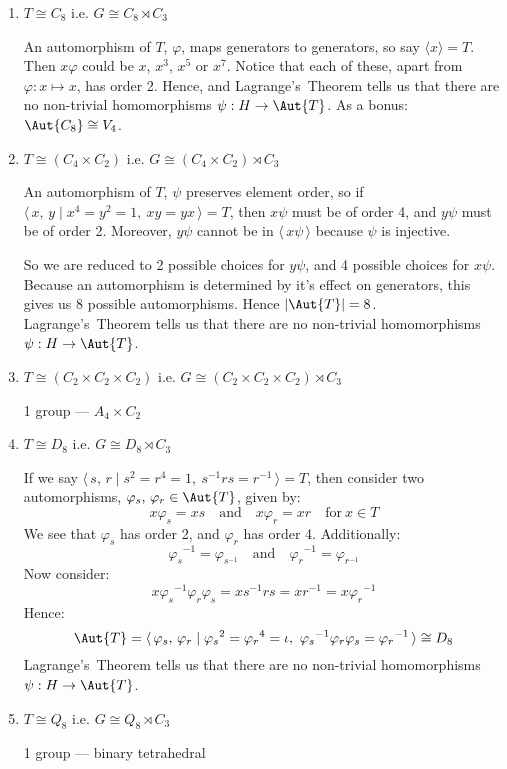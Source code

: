 \begin{enumerate}
    \item \(T \cong C_8\) i.e. \(G \cong C_8 \rtimes C_3\)

        An automorphism of \(T\), \(\varphi\), maps generators to generators, so say \(\langle x \rangle = T\).
        Then \(x\varphi\) could be \(x\), \(x^3\), \(x^5\) or \(x^7\).
        Notice that each of these, apart from \(\varphi:x \mapsto x\), has order 2.
        Hence, and Lagrange's~Theorem tells us that there are no non-trivial homomorphisms \(\psi:H \to \Aut{T}\).
        As a bonus: \(\Aut{C_8} \cong V_4\).

    \item \(T \cong (C_4 \times C_2)\) i.e. \(G \cong (C_4 \times C_2) \rtimes C_3\)
        
        An automorphism of \(T\), \(\psi\) preserves element order, so if \(\langle\,x,\,y \mid x^4 = y^2 = 1,\ xy =
        yx\,\rangle = T\), then \(x\psi\) must be of order 4, and \(y\psi\) must be of order 2.
        Moreover, \(y\psi\) cannot be in \(\langle\,x\psi\,\rangle\) because \(\psi\) is injective.

        So we are reduced to 2 possible choices for \(y\psi\), and 4 possible choices for \(x\psi\).
        Because an automorphism is determined by it's effect on generators, this gives us 8 possible automorphisms.
        Hence \(|\Aut{T}| = 8\).
        Lagrange's~Theorem tells us that there are no non-trivial homomorphisms \(\psi:H \to \Aut{T}\).

    \item \(T \cong (C_2 \times C_2 \times C_2)\) i.e. \(G \cong (C_2 \times C_2 \times C_2) \rtimes C_3\)

        1 group --- \(A_4 \times C_2\)
    \item \(T \cong D_8\) i.e. \(G \cong D_8 \rtimes C_3\)
        
        If we say \(\langle\,s,\,r \mid s^2 = r^4 = 1,\ s^{-1}rs = r^{-1}\,\rangle = T\), then consider two
        automorphisms, \(\varphi_s,\,\varphi_r \in
        \Aut{T}\), given by:
        \[x\varphi_s = xs \quad \text{and} \quad x\varphi_r = xr \quad \text{for}\ x \in T\]
        We see that \(\varphi_s\) has order 2, and \(\varphi_r\) has order 4.
        Additionally:
        \[{\varphi_s}^{-1} = \varphi_{s^{-1}} \quad \text{and} \quad {\varphi_r}^{-1} = \varphi_{r^{-1}}\]
        Now consider:
        \[x{\varphi_s}^{-1}{\varphi_r}{\varphi_s} = xs^{-1}rs = xr^{-1} = x{\varphi_r}^{-1}\]
        Hence:
        \[\Aut{T} = \langle\, \varphi_s,\,\varphi_r \mid {\varphi_s}^2 = {\varphi_r}^4 = \iota,\
        {\varphi_s}^{-1}{\varphi_r}{\varphi_s} = {\varphi_r}^{-1}\,\rangle \cong D_8\]
        Lagrange's~Theorem tells us that there are no non-trivial homomorphisms \(\psi:H \to \Aut{T}\).

    \item \(T \cong Q_8\) i.e. \(G \cong Q_8 \rtimes C_3\)

        1 group --- binary tetrahedral
\end{enumerate}


